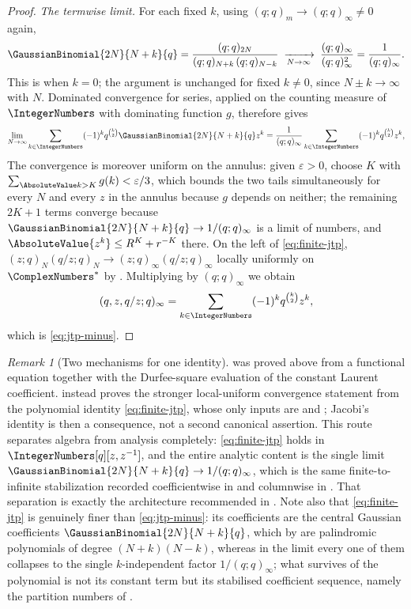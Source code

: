 \documentclass[11pt,a4paper,oneside,openany]{book}
\theoremstyle{definition}
\theoremstyle{remark}
\newtheorem{remark}[remark]{Remark}
\newcommand{\eps}{\varepsilon}
\begin{document}
\begin{proof}
\emph{The termwise limit.}  For each fixed $k$, using $(q;q)_m\to(q;q)_\infty\ne0$ again,
\[
 \GaussianBinomial{2N}{N+k}{q}
 =\frac{(q;q)_{2N}}{(q;q)_{N+k}\,(q;q)_{N-k}}
 \;\xrightarrow[N\to\infty]{}\;
 \frac{(q;q)_\infty}{(q;q)_\infty^{2}}
 =\frac1{(q;q)_\infty}.
\]
This is  when $k=0$; the argument is unchanged for
fixed $k\ne0$, since $N\pm k\to\infty$ with $N$.
Dominated convergence for series, applied on the counting measure of $\IntegerNumbers$ with dominating function $g$, therefore gives
\[
 \lim_{N\to\infty}\sum_{k\in\IntegerNumbers}(-1)^kq^{\binom k2}
 \GaussianBinomial{2N}{N+k}{q}z^{k}
 =\frac1{(q;q)_\infty}\sum_{k\in\IntegerNumbers}(-1)^kq^{\binom k2}z^{k},
\]
The convergence is moreover uniform on the annulus: given $\eps>0$, choose $K$ with $\sum_{\AbsoluteValue k>K}g(k)<\eps/3$, which bounds the two tails simultaneously for every $N$ and every $z$ in the annulus because $g$ depends on neither; the remaining $2K+1$ terms converge because $\GaussianBinomial{2N}{N+k}{q}\to1/(q;q)_\infty$ is a limit of numbers, and $\AbsoluteValue{z^k}\le R^{K}+r^{-K}$ there.  On the left of \eqref{eq:finite-jtp}, $(z;q)_N(q/z;q)_N\to(z;q)_\infty(q/z;q)_\infty$ locally uniformly on $\ComplexNumbers^{*}$ by .  Multiplying by $(q;q)_\infty$ we obtain
\[
 (q,z,q/z;q)_\infty
 =\sum_{k\in\IntegerNumbers}(-1)^kq^{\binom k2}z^{k},
\]
which is \eqref{eq:jtp-minus}.
\end{proof}

\begin{remark}[Two mechanisms for one identity]\label{rem:jtp-two-proofs}
 was proved above from a functional equation together with the Durfee-square evaluation of the constant Laurent coefficient.   instead proves the stronger local-uniform convergence statement from the polynomial identity \eqref{eq:finite-jtp}, whose only inputs are  and ; Jacobi's identity is then a consequence, not a second canonical assertion.  This route separates algebra from analysis completely: \eqref{eq:finite-jtp} holds in $\IntegerNumbers[q][z,z^{-1}]$, and the entire analytic content is the single limit $\GaussianBinomial{2N}{N+k}{q}\to1/(q;q)_\infty$, which is the same finite-to-infinite stabilization recorded coefficientwise in  and columnwise in .  That separation is exactly the architecture recommended in .  Note also that \eqref{eq:finite-jtp} is genuinely finer than \eqref{eq:jtp-minus}: its coefficients are the central Gaussian coefficients $\GaussianBinomial{2N}{N+k}{q}$, which by  are palindromic polynomials of degree $(N+k)(N-k)$, whereas in the limit every one of them collapses to the single $k$-independent factor $1/(q;q)_\infty$; what survives of the polynomial is not its constant term but its stabilised coefficient sequence, namely the partition numbers of .
\end{remark}
\end{document}

